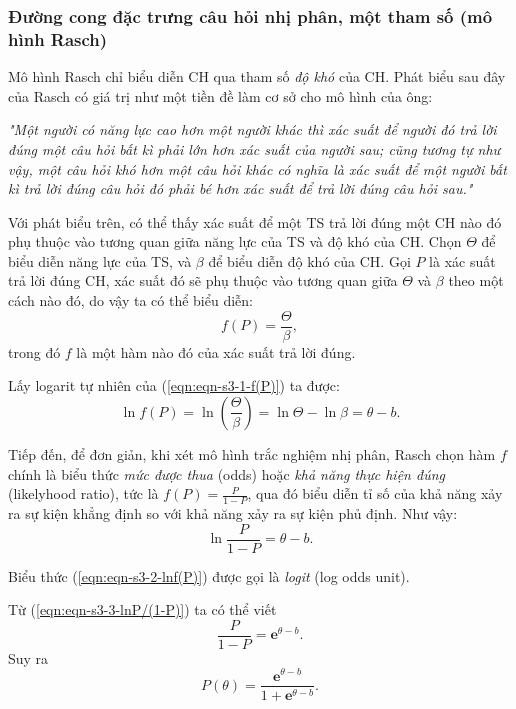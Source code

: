 \subsubsection{Đường cong đặc trưng câu hỏi nhị phân, một tham số (mô hình Rasch)}
Mô hình Rasch chỉ biểu diễn CH qua tham số \textit{độ khó} của CH. Phát biểu sau đây của Rasch có giá trị như một tiền đề làm cơ sở cho mô hình của ông:\par
{\raggedleft\textit{"Một người có năng lực cao hơn một người khác thì xác suất để người đó trả lời đúng một câu hỏi bất kì phải lớn hơn xác suất của người sau; cũng tương tự như vậy, một câu hỏi khó hơn một câu hỏi khác có nghĩa là xác suất để một người bất kì trả lời đúng câu hỏi đó phải bé hơn xác suất để trả lời đúng câu hỏi sau."} \cite{rasch1993probabilistic}\par}
Với phát biểu trên, có thể thấy xác suất để một TS trả lời đúng một CH nào đó phụ thuộc vào tương quan giữa năng lực của TS và độ khó của CH. Chọn $\Theta$ để biểu diễn năng lực của TS, và $\beta$ để biểu diễn độ khó của CH. Gọi $P$ là xác suất trả lời đúng CH, xác suất đó sẽ phụ thuộc vào tương quan giữa $\Theta$ và $\beta$ theo một cách nào đó, do vậy ta có thể biểu diễn:
\begin{equation}\label{eqn:eqn-s3-1-f(P)}
	f(P)=\frac{\Theta}{\beta},
\end{equation}
trong đó $f$ là một hàm nào đó của xác suất trả lời đúng.\par
Lấy logarit tự nhiên của (\ref{eqn:eqn-s3-1-f(P)}) ta được:
\begin{equation}\label{eqn:eqn-s3-2-lnf(P)}
	\ln f(P)=\ln\left(\frac{\Theta}{\beta}\right)=\ln\Theta-\ln\beta=\theta-b.
\end{equation}\par
Tiếp đến, để đơn giản, khi xét mô hình trắc nghiệm nhị phân, Rasch chọn hàm $f$ chính là biểu thức \textit{mức được thua} (odds) hoặc \textit{khả năng thực hiện đúng} (likelyhood ratio), tức là $f(P)=\frac{P}{1-P}$, qua đó biểu diễn tỉ số của khả năng xảy ra sự kiện khẳng định so với khả năng xảy ra sự kiện phủ định. Như vậy:
\begin{equation}\label{eqn:eqn-s3-3-lnP/(1-P)}
	\ln\frac{P}{1-P}=\theta-b.
\end{equation}\par
Biểu thức (\ref{eqn:eqn-s3-2-lnf(P)}) được gọi là \textit{logit} (log odds unit).\par
Từ (\ref{eqn:eqn-s3-3-lnP/(1-P)}) ta có thể viết $$\frac{P}{1-P}=\mathbf{e}^{\theta-b}.$$
Suy ra
\begin{equation}\label{eqn:eqn-s3-4-P(theta)}
	P(\theta)=\frac{\mathbf{e}^{\theta-b}}{1+\mathbf{e}^{\theta-b}}.
\end{equation}\par
